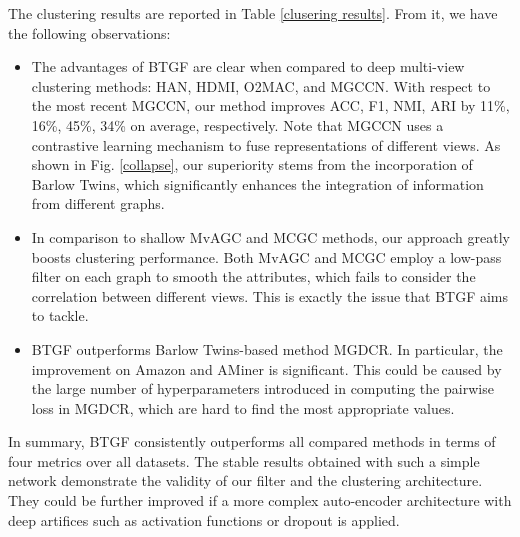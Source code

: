 \documentclass[letterpaper]{article} %
\begin{document}
The clustering results are reported in Table \ref{clusering results}. From it, we have the following observations:
\begin{itemize}
    \item The advantages of BTGF are clear when compared to deep multi-view clustering methods: HAN, HDMI, O2MAC, and MGCCN. With respect to the most recent MGCCN, our method improves ACC, F1, NMI, ARI by 11\%, 16\%, 45\%, 34\% on average, respectively. Note that MGCCN uses a contrastive learning mechanism to fuse representations of different views. %
    As shown in Fig. \ref{collapse}, our superiority stems from the incorporation of Barlow Twins, which significantly enhances the integration of information from different graphs.

    \item In comparison to shallow MvAGC and MCGC methods, our approach greatly boosts clustering performance. Both MvAGC and MCGC employ a low-pass filter on each graph to smooth the attributes, which fails to consider the correlation between different views. This is exactly the issue that BTGF aims to tackle. %

    \item BTGF outperforms Barlow Twins-based method MGDCR. In particular, the improvement on Amazon and AMiner is significant. This could be caused by the large number of hyperparameters introduced in computing the pairwise loss in MGDCR, which are hard to find the most appropriate values.%
\end{itemize}
In summary, BTGF consistently outperforms all compared methods in terms of four metrics over all datasets. The stable results obtained with such a simple network demonstrate the validity of our filter and the clustering architecture.
They could be further improved if a more complex auto-encoder architecture with deep artifices such as activation functions or dropout is applied.
\end{document}
